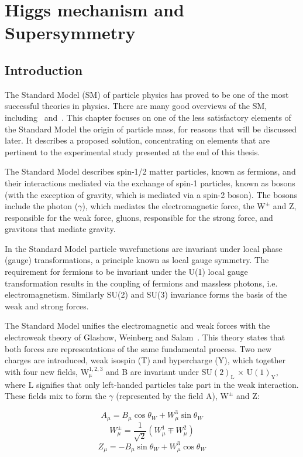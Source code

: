 \chapter{Higgs mechanism and Supersymmetry}

\section{Introduction}
The Standard Model (SM) of particle physics has proved to be one of the most successful theories in physics. There are many good overviews of the SM, including~\cite{HALZEN} and~\cite{GRIFFITHS}. This chapter focuses on one of the less satisfactory elements of the Standard Model the origin of particle mass, for reasons that will be discussed later. It describes a proposed solution, concentrating on elements that are pertinent to the experimental study presented at the end of this thesis.

The Standard Model describes spin-1/2 matter particles, known as fermions, and their interactions mediated via the exchange of spin-1 particles, known as bosons (with the exception of gravity, which is mediated via a spin-2 boson). The bosons include the photon ($\gamma$), which mediates the electromagnetic force, the $\mathrm{W^{\pm}}$ and Z, responsible for the weak force, gluons, responsible for the strong force, and gravitons that mediate gravity.

In the Standard Model particle wavefunctions are invariant under local phase (gauge) transformations, a principle known as local gauge symmetry. The requirement for fermions to be invariant under the U(1) local gauge transformation results in the coupling of fermions and massless photons, i.e. electromagnetism. Similarly SU(2) and SU(3) invariance forms the basis of the weak and strong forces.

The Standard Model unifies the electromagnetic and weak forces with the electroweak theory of Glashow, Weinberg and Salam~\cite{Salam:1964ry}. This theory states that both forces are representations of the same fundamental process. Two new charges are introduced, weak isospin (T) and hypercharge (Y), which together with four new fields, $\mathrm{W^{1,2,3}_{\mu}}$ and B are invariant under SU$(2)_\mathrm{L}$ $\times$ U$(1)_{\mathrm{Y}}$, where L signifies that only left-handed particles take part in the weak interaction. These fields mix to form the $\gamma$ (represented by the field A), $\mathrm{W^{\pm}}$ and Z:

\begin{equation}
	A_{\mu} = B_{\mu} \cos{\theta_{W}} + W_{\mu}^{3} \sin{\theta_{W}}
	\label{eqn:A}
\end{equation}
\begin{equation}
	W_{\mu}^{\pm} = \frac{1}{\sqrt{2}}(W_{\mu}^{1} \mp W_{\mu}^{2})
	\label{eqn:W}
\end{equation}
\begin{equation}
	Z_{\mu} = - B_{\mu} \sin{\theta_{W}} + W_{\mu}^{3} \cos{\theta_{W}}
	\label{eqn:Z}
\end{equation}

